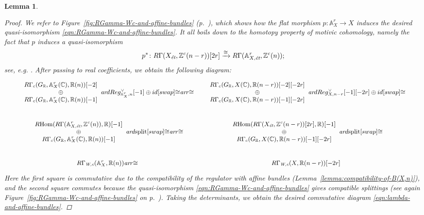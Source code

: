 \documentclass[10pt,a4paper,oneside]{article}
\DeclareMathOperator{\Hom}{Hom}
\newcommand{\CC}{\mathbb{C}}
\newcommand{\RR}{\mathbb{R}}
\newcommand{\ZZ}{\mathbb{Z}}
\renewcommand{\AA}{\mathbb{A}}
\newcommand{\ar}{\text{\it ar}}
\newcommand{\et}{\text{\it \'{e}t}}
\newcommand{\Wc}{\text{\it W,c}}
\newcommand{\RHom}{R\!\Hom}
\theoremstyle{myplain}
\newtheorem{lemma}[theorem]{Lemma}
\theoremstyle{mydefinition}
\numberwithin{equation}{section}
\begin{document}
\begin{lemma}
  \begin{proof}
    We refer to Figure~\ref{fig:RGamma-Wc-and-affine-bundles}
    (p.~\pageref{fig:RGamma-Wc-and-affine-bundles}), which shows how the flat
    morphism $p\colon \AA^r_X \to X$ induces the desired quasi-isomorphism
    \eqref{eqn:RGamma-Wc-and-affine-bundles}. It all boils down to the homotopy
    property of motivic cohomology, namely the fact that $p$ induces a
    quasi-isomorphism
    \[ p^*\colon R\Gamma (X_\et, \ZZ^c (n-r)) [2r] \xrightarrow{\cong}
      R\Gamma (\AA^r_{X,\et}, \ZZ^c (n)); \]
    see, e.g. \cite[Lemma~5.11]{Morin-2014}.
    After passing to real coefficients, we obtain the following diagram:
    \[ \begin{tikzcd}[column sep=1em, font=\small]
        \begin{array}{c} R\Gamma_c (G_\RR, \AA^r_X (\CC), \RR (n)) [-2] \\ \oplus \\ R\Gamma_c (G_\RR, \AA^r_X (\CC), \RR (n)) [-1] \end{array} \ar{d}{Reg_{\AA^r_X,n}^\vee [-1] \oplus id}[swap]{\cong} \ar{r}{\cong} & \begin{array}{c} R\Gamma_c (G_\RR, X (\CC), \RR (n-r)) [-2] [-2r] \\ \oplus \\ R\Gamma_c (G_\RR, X (\CC), \RR (n-r)) [-1] [-2r] \end{array} \ar{d}{Reg_{X,n-r}^\vee [-1] [-2r] \oplus id}[swap]{\cong} \\
        \begin{array}{c} \RHom (R\Gamma (\AA^r_{X,\et}, \ZZ^c (n)), \RR) [-1] \\ \oplus \\ R\Gamma_c (G_\RR, \AA^r_X (\CC), \RR (n)) [-1] \end{array} \ar{d}{\text{split}}[swap]{\cong} \ar{r}{\cong} & \begin{array}{c} \RHom (R\Gamma (X_\et, \ZZ^c (n-r)) [2r], \RR) [-1] \\ \oplus \\ R\Gamma_c (G_\RR, X (\CC), \RR (n-r)) [-1] [-2r] \end{array} \ar{d}{\text{split}}[swap]{\cong} \\
        R\Gamma_\Wc (\AA^r_X, \RR (n)) \ar{r}{\cong} & R\Gamma_\Wc (X, \RR (n-r)) [-2r]
      \end{tikzcd} \]
    Here the first square is commutative due to the compatibility of the
    regulator with affine bundles (Lemma~\ref{lemma:compatibility-of-B(X,n)}),
    and the second square commutes because the quasi-isomorphism
    \eqref{eqn:RGamma-Wc-and-affine-bundles} gives compatible splittings
    (see again Figure~\ref{fig:RGamma-Wc-and-affine-bundles} on
    p.~\pageref{fig:RGamma-Wc-and-affine-bundles}). Taking the determinants, we
    obtain the desired commutative diagram
    \eqref{eqn:lambda-and-affine-bundles}.
  \end{proof}
\end{lemma}
\end{document}
